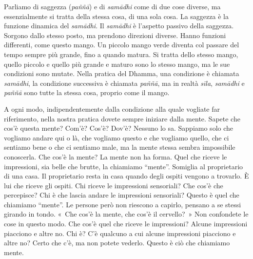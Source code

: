 Parliamo di saggezza (\emph{paññā}) e di \emph{samādhi} come di due cose
diverse, ma essenzialmente si tratta della stessa cosa, di una sola
cosa. La saggezza è la funzione dinamica del \emph{samādhi}. Il
\emph{samādhi} è l'aspetto passivo della saggezza. Sorgono dallo stesso
posto, ma prendono direzioni diverse. Hanno funzioni differenti, come
questo mango. Un piccolo mango verde diventa col passare del tempo
sempre più grande, fino a quando matura. Si tratta dello stesso mango,
quello piccolo e quello più grande e maturo sono lo stesso mango, ma le
sue condizioni sono mutate. Nella pratica del Dhamma, una condizione è
chiamata \emph{samādhi}, la condizione successiva è chiamata
\emph{paññā}, ma in realtà \emph{sīla}, \emph{samādhi} e \emph{paññā}
sono tutte la stessa cosa, proprio come il mango.

A ogni modo, indipendentemente dalla condizione alla quale vogliate far
riferimento, nella nostra pratica dovete sempre iniziare dalla mente.
Sapete che cos'è questa mente? Com'è? Cos'è? Dov'è? Nessuno lo sa.
Sappiamo solo che vogliamo andare qui o là, che vogliamo questo e che
vogliamo quello, che ci sentiamo bene o che ci sentiamo male, ma la
mente stessa sembra impossibile conoscerla. Che cos'è la mente? La mente
non ha forma. Quel che riceve le impressioni, sia belle che brutte, la
chiamiamo ``mente''. Somiglia al proprietario di una casa. Il
proprietario resta in casa quando degli ospiti vengono a trovarlo. È lui
che riceve gli ospiti. Chi riceve le impressioni sensoriali? Che cos'è
che percepisce? Chi è che lascia andare le impressioni sensoriali?
Questo è quel che chiamiamo ``mente''. Le persone però non riescono a
capirlo, pensano a se stessi girando in tondo. «~Che cos'è la mente, che
cos'è il cervello?~» Non confondete le cose in questo modo. Che cos'è
quel che riceve le impressioni? Alcune impressioni piacciono e altre no.
Chi è? C'è qualcuno a cui alcune impressioni piacciono e altre no? Certo
che c'è, ma non potete vederlo. Questo è ciò che chiamiamo mente.

